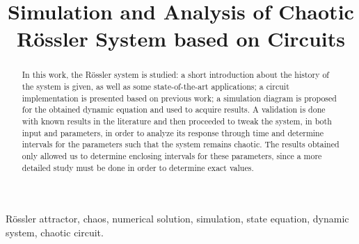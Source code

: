 \documentclass[conference]{IEEEtran}
\begin{document}
\title{Simulation and Analysis of Chaotic Rössler System based on Circuits\\}

\author{
\and
{}
}

\maketitle

\begin{abstract}
In this work, the Rössler system is studied: a short introduction about the history of the system is given, as well as some state-of-the-art applications; a circuit implementation is presented based on previous work; a simulation diagram is proposed for the obtained dynamic equation and used to acquire results. A validation is done with known results in the literature and then proceeded to tweak the system, in both input and parameters, in order to analyze its response through time and determine intervals for the parameters such that the system remains chaotic. The results obtained only allowed us to determine enclosing intervals for these parameters, since a more detailed study must be done in order to determine exact values.
\end{abstract}

\begin{IEEEkeywords}
Rössler attractor, chaos, numerical solution, simulation, state equation, dynamic system, chaotic circuit.
\end{IEEEkeywords}






\nocite{*}


\end{document}
